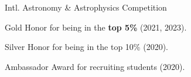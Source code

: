 \entryItem
	{Intl. Astronomy \& Astrophysics Competition}
	{}

	\begin{items}
		\item Gold Honor for being in the \textbf{top 5\%} (2021, 2023).
		\item Silver Honor for being in the top 10\% (2020).
		\item Ambassador Award for recruiting students (2020).
	\end{items}
